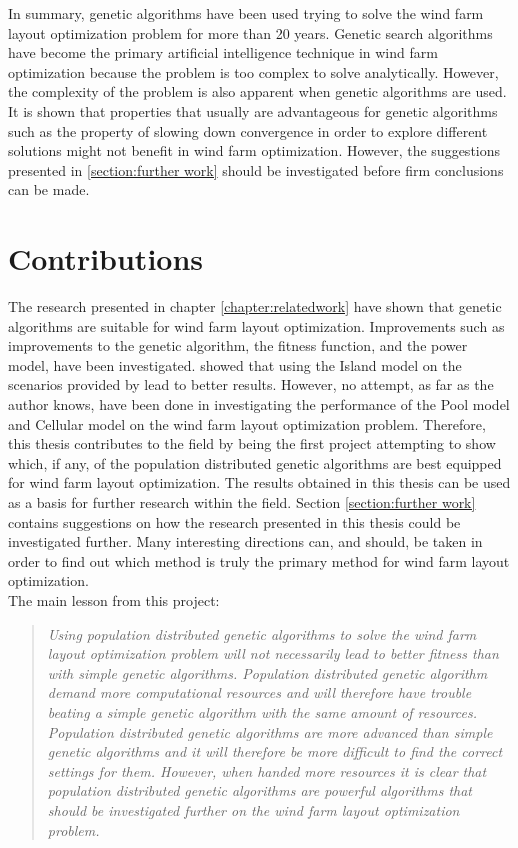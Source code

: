 \noindent In summary, genetic algorithms have been used trying to solve the wind farm layout optimization problem for more than 20 years. Genetic search algorithms have become the primary artificial intelligence technique in wind farm optimization because the problem is too complex to solve analytically. However, the complexity of the problem is also apparent when genetic algorithms are used. It is shown that properties that usually are advantageous for genetic algorithms such as the property of slowing down convergence in order to explore different solutions might not benefit in wind farm optimization. However, the suggestions presented in \ref{section:further work} should be investigated before firm conclusions can be made.\\


\section{Contributions}\label{section:contributions}


The research presented in chapter \ref{chapter:relatedwork} have shown that genetic algorithms are suitable for wind farm layout optimization. Improvements such as improvements to the genetic algorithm, the fitness function, and the power model, have been investigated. \citep{Grady} showed that using the Island model on the scenarios provided by \citep{Mosetti} lead to better results. However, no attempt, as far as the author knows, have been done in investigating the performance of the Pool model and Cellular model on the wind farm layout optimization problem. Therefore, this thesis contributes to the field by being the first project attempting to show which, if any, of the population distributed genetic algorithms are best equipped for wind farm layout optimization. The results obtained in this thesis can be used as a basis for further research within the field. Section \ref{section:further work} contains suggestions on how the research presented in this thesis could be investigated further. Many interesting directions can, and should, be taken in order to find out which method is truly the primary method for wind farm layout optimization.\\


\noindent The main lesson from this project:\\


\begin{quote}
\textit{Using population distributed genetic algorithms to solve the wind farm layout optimization problem will not necessarily lead to better fitness than with simple genetic algorithms. Population distributed genetic algorithm demand more computational resources and will therefore have trouble beating a simple genetic algorithm with the same amount of resources. Population distributed genetic algorithms are more advanced than simple genetic algorithms and it will therefore be more difficult to find the correct settings for them. However, when handed more resources it is clear that population distributed genetic algorithms are powerful algorithms that should be investigated further on the wind farm layout optimization problem.}
\end{quote}


